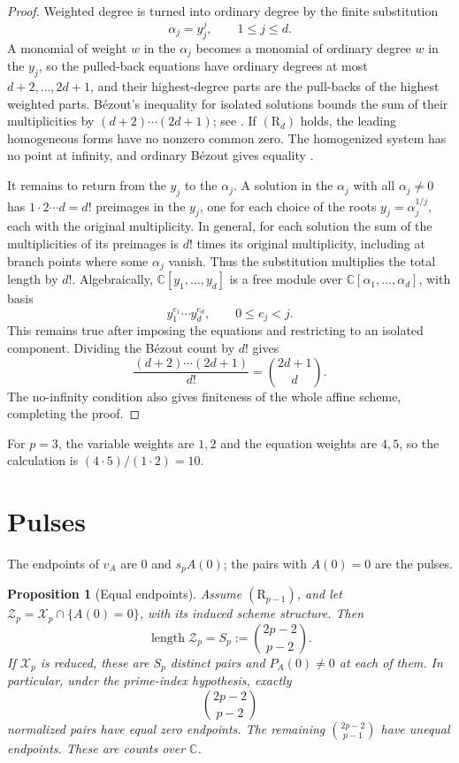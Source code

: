 \documentclass[11pt]{article}
\newtheorem{proposition}[theorem]{Proposition}
\newcommand{\CC}{\mathbb C}
\newcommand{\len}{\operatorname{length}}
\newcommand{\Xp}{\mathcal X_p}
\numberwithin{equation}{section}
\begin{document}
\begin{proof}
Weighted degree is turned into ordinary degree by the finite
substitution
\begin{equation}\label{eq:weighted-cover}
 \alpha_j=y_j^j,\qquad 1\le j\le d.
\end{equation}
A monomial of weight \(w\) in the \(\alpha_j\) becomes a monomial of
ordinary degree \(w\) in the \(y_j\), so the pulled-back equations
have ordinary degrees at most \(d+2,\ldots,2d+1\), and their
highest-degree parts are the pull-backs of the highest weighted parts.
B\'ezout's inequality for isolated solutions bounds the sum of their
multiplicities by
\((d+2)\cdots(2d+1)\); see \citet[Chapter~VIII]{Mondal2021}.
If \((\mathrm R_d)\) holds, the leading homogeneous forms have
no nonzero common zero. The homogenized system has no point at
infinity, and ordinary B\'ezout gives equality
\citep{CoxLittleOShea2005}.

It remains to return from the \(y_j\) to the \(\alpha_j\).
A solution in the \(\alpha_j\) with all \(\alpha_j\ne0\) has
\(1\cdot2\cdots d=d!\) preimages in the \(y_j\), one for each
choice of the roots \(y_j=\alpha_j^{1/j}\), each with the original
multiplicity. In general, for each solution the sum of the
multiplicities of its preimages is \(d!\) times its original
multiplicity, including at branch points where some \(\alpha_j\)
vanish. Thus the substitution multiplies the total length by \(d!\).
Algebraically, \(\CC[y_1,\ldots,y_d]\) is a free module over
\(\CC[\alpha_1,\ldots,\alpha_d]\), with basis
\[
 y_1^{e_1}\cdots y_d^{e_d},\qquad 0\le e_j<j.
\]
This remains true after imposing the equations and restricting to
an isolated component.
Dividing the B\'ezout count by \(d!\) gives
\[
 \frac{(d+2)\cdots(2d+1)}{d!}=\binom{2d+1}{d}.
\]
The no-infinity condition also gives finiteness of the whole affine
scheme, completing the proof.
\end{proof}

For \(p=3\), the variable weights are \(1,2\) and the equation
weights are \(4,5\), so the calculation is
\((4\cdot5)/(1\cdot2)=10\).


\section{Pulses}

The endpoints of \(v_A\) are \(0\) and \(s_pA(0)\); the pairs with
\(A(0)=0\) are the pulses.

\begin{proposition}[Equal endpoints]\label{cor:endpoints}
Assume \((\mathrm R_{p-1})\), and let
\(\mathcal Z_p=\Xp\cap\{A(0)=0\}\), with its induced scheme structure.
Then
\begin{equation}\label{eq:pulse-length}
 \len\mathcal Z_p=S_p:=\binom{2p-2}{p-2}.
\end{equation}
If \(\Xp\) is reduced, these are \(S_p\) distinct pairs and
\(P_A(0)\ne0\) at each of them.
In particular, under the prime-index hypothesis, exactly
\[
 \binom{2p-2}{p-2}
\]
normalized pairs have equal zero endpoints. The remaining
\(\binom{2p-2}{p-1}\) have unequal endpoints.
These are counts over \(\CC\).
\end{proposition}
\end{document}
